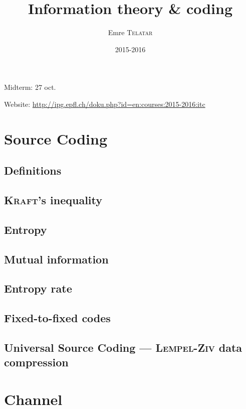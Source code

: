 

\title{Information theory \& coding}
\author{Emre \textsc{Telatar}}
\date{2015-2016}


\maketitle
\tableofcontents

\newpage

Midterm: 27 oct.

Website: \url{http://ipg.epfl.ch/doku.php?id=en:courses:2015-2016:itc}

\chapter{Source Coding}
    \section{Definitions}
        
    \section{\textsc{Kraft}'s inequality}
        
    \section{Entropy}
        
    \section{Mutual information}
        
    \section{Entropy rate}
        
    \section{Fixed-to-fixed codes}
        
    \section[Universal Source Coding]{Universal Source Coding \---- \textsc{Lempel}-\textsc{Ziv} data compression}
        

\chapter{Channel}
    
    
